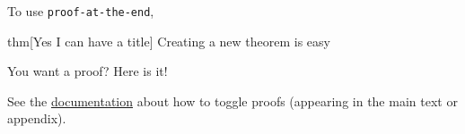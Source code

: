 \documentclass{article}
\begin{document}
To use \verb|proof-at-the-end|, 
\begin{theoremEnd}{thm}[Yes I can have a title]
\label{thm:ilikelabels}
Creating a new theorem is easy
\end{theoremEnd}
\begin{proofEnd}
You want a proof? Here is it!
\end{proofEnd}
See the \href{http://ctan.mirror.globo.tech/macros/latex/contrib/proof-at-the-end/proof-at-the-end.pdf}{documentation} about how to toggle proofs (appearing in the main text or appendix).
	
\printbibliography[title={References}]
\end{document}
